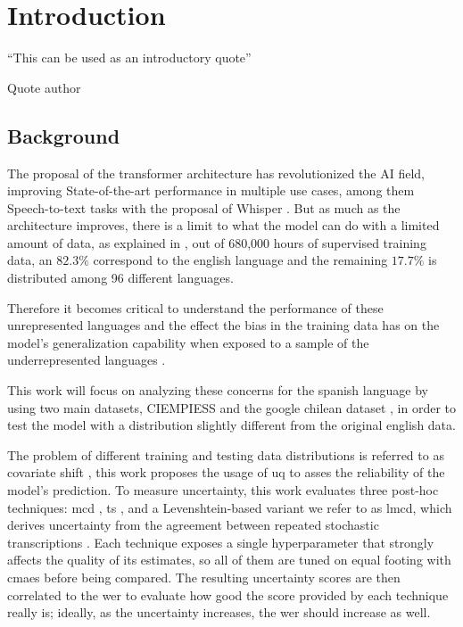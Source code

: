 \chapter{Introduction}
\label{chapter:introduction}


\epigraph{``This can be used as an introductory quote''}{Quote author}

\newpage

\section{Background}
The proposal of the transformer architecture \cite{vaswani2017attention} has revolutionized the AI field, improving State-of-the-art performance in multiple use cases, among them Speech-to-text tasks with the proposal of Whisper \cite{radford2023robust}. But as much as the architecture improves, there is a limit to what the model can do with a limited amount of data, as explained in \cite{radford2023robust}, out of 680,000 hours of supervised training data, an $82.3\%$ correspond to the english language and the remaining $17.7\%$ is distributed among 96 different languages.

Therefore it becomes critical to understand the performance of these unrepresented languages and the effect the bias in the training data has on the model's generalization capability when exposed to a sample of the underrepresented languages \cite{navigli2023biases}.

This work will focus on analyzing these concerns for the spanish language by using two main datasets, CIEMPIESS \cite{hernandez2017automatic} and the google chilean dataset \cite{guevara-rukoz-etal-2020-crowdsourcing}, in order to test the model with a distribution slightly different from the original english data.

The problem of different training and testing data distributions is referred to as covariate shift \cite{shao2024open}, this work proposes the usage of \acrfull{uq} to asses the reliability of the model's prediction\cite{psaros2023uncertainty}.
To measure uncertainty, this work evaluates three post-hoc techniques: \acrfull{mcd} \cite{gal2016dropout}, \acrfull{ts} \cite{guo2017calibration}, and a Levenshtein-based variant we refer to as \acrfull{lmcd}, which derives uncertainty from the agreement between repeated stochastic transcriptions \cite{rodriguez2024uncertainty}. Each technique exposes a single hyperparameter that strongly affects the quality of its estimates, so all of them are tuned on equal footing with \acrfull{cmaes} \cite{hansen2001completely} before being compared. The resulting uncertainty scores are then correlated to the \acrfull{wer} to evaluate how good the score provided by each technique really is; ideally, as the uncertainty increases, the \acrshort{wer} should increase as well.

